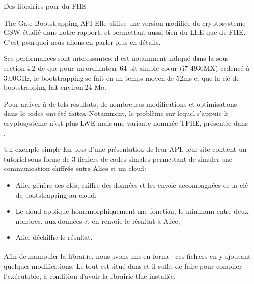 \begin{section}{Des librairies pour du FHE}
\begin{subsection}{The Gate Bootstrapping API}
Elle utilise une version modifiée du cryptosysteme GSW \cite{C:GenSahWat13}
étudié dans notre rapport, et permettant aussi bien du LHE que du FHE. C'est
pourquoi nous allons en parler plus en détails.

Ses performances sont interessantes; il est notamment indiqué dans la sous-section
4.2 de \cite{cryptoeprint:2016:870} que pour un ordinateur 64-bit simple coeur 
(i7-4930MX) cadencé à 3.00GHz, le bootstrapping se fait en un temps moyen de 52ms et 
que la clé de bootstrapping fait environ 24 Mo.

Pour arriver à de tels résultats, de nombreuses modifications et optimisations dans le codes ont été faites. Notamment,
le problème sur lequel s'appuie le cryptosystème n'est plus LWE mais une variante nommée TFHE, présentée dans
\cite{cryptoeprint:2016:870}. 

\begin{subsubsection}{Un exemple simple}
En plus d'une présentation de leur API, leur site contient un tutoriel sous forme de 3 fichiers de codes simples
permettant de simuler une communication chiffrée entre Alice et un cloud:
\begin{itemize}
\item Alice génère des clés, chiffre des données et les envoie accompagnées de la clé de bootstrapping au cloud;
\item Le cloud applique homomorphiquement une fonction, le minimum entre deux nombres, aux données et en renvoie le résultat à Alice;
\item Alice déchiffre le résultat.
\end{itemize}

\paragraph{}
Afin de manipuler la librairie, nous avons \og mis en forme \fg \ ces fichiers
en y ajoutant quelques modifications. Le tout est situé dans 
 et il suffit de faire  
pour compiler l'exécutable, à condition d'avoir la librairie tfhe installée.
	

\end{subsubsection}
\end{subsection}
\end{section}
